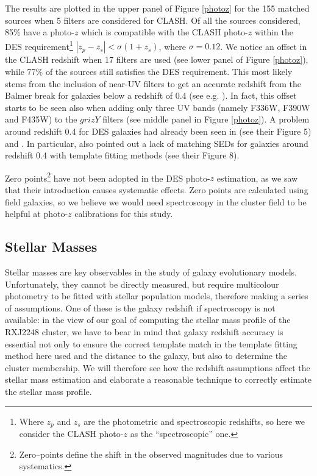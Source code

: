 {The results are plotted in the upper panel of Figure \ref{photoz} for the 155 matched sources when 5 filters are considered for CLASH. 
 Of all the sources considered, 85\% have a photo-$z$ which is compatible with the CLASH photo-$z$ within the DES requirement\footnote{Where $z_p$ and $z_s$ are the photometric and spectroscopic redshifts, so here we consider the CLASH photo-$z$ as the ``spectroscopic'' one. } $|z_{p}-z_{s}|< \sigma(1+z_{s})$, where $\sigma=0.12$. 
We notice an offset in the CLASH redshift when 17 filters are used (see lower panel of Figure \ref{photoz}), while 77\% of the sources still satisfies the DES requirement. This most likely stems from the inclusion of near-UV filters to get an accurate redshift from the Balmer break for galaxies below a redshift of 0.4 (see e.g. \citealt{Eisenstein2}). In fact, this offset starts to be seen also when adding only three UV bands (namely F336W, F390W and F435W) to the $grizY$ filters (see middle panel in Figure \ref{photoz}). A problem around redshift 0.4 for DES galaxies had already been seen in \citet{sanchez} (see their Figure 5) and \citet{bonnett}. In particular, \citet{bonnett} also pointed out a lack of matching SEDs for galaxies around redshift 0.4 with template fitting methods (see their Figure 8). 

Zero points\footnote{Zero--points define the shift in the observed magnitudes due to various systematics.} have not been adopted in the DES photo-$z$ estimation, as we saw that their introduction causes systematic effects. Zero points are calculated using field galaxies, so we believe we would need spectroscopy in the cluster field to be helpful at photo-$z$ calibrations for this study.\\

\subsection{Stellar Masses}\label{clash_sm}

Stellar masses are key observables in the study of galaxy evolutionary models. Unfortunately, they cannot be directly measured, but require multicolour photometry to be fitted with stellar population models, therefore making a series of assumptions. One of these is the galaxy redshift if spectroscopy is not available: in the view of our goal of computing the stellar mass profile of the RXJ2248 cluster, we have to bear in mind that galaxy redshift accuracy is essential not only to ensure the correct template match in the template fitting method here used and the distance to the galaxy, but also to determine the cluster membership. We will therefore see how the redshift assumptions affect the stellar mass estimation and elaborate a reasonable technique to correctly estimate the stellar mass profile.

}
